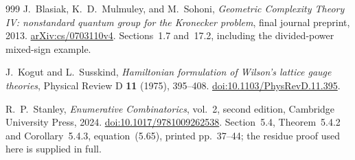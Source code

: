 \begin{thebibliography}{999}
J.~Blasiak, K.~D.~Mulmuley, and M.~Sohoni,
\emph{Geometric Complexity Theory IV: nonstandard quantum group for the
Kronecker problem}, final journal preprint, 2013.
\href{https://arxiv.org/abs/cs/0703110v4}{arXiv:cs/0703110v4}.
Sections~1.7 and~17.2, including the divided-power mixed-sign example.

J.~Kogut and L.~Susskind,
\emph{Hamiltonian formulation of Wilson's lattice gauge theories},
Physical Review D \textbf{11} (1975), 395--408.
\href{https://doi.org/10.1103/PhysRevD.11.395}{doi:10.1103/PhysRevD.11.395}.

R.~P.~Stanley, \emph{Enumerative Combinatorics}, vol.~2, second edition,
Cambridge University Press, 2024.
\href{https://doi.org/10.1017/9781009262538}{doi:10.1017/9781009262538}.
Section~5.4, Theorem~5.4.2 and Corollary~5.4.3, equation~(5.65),
printed pp.~37--44; the residue proof used here is supplied in full.

\end{thebibliography}
